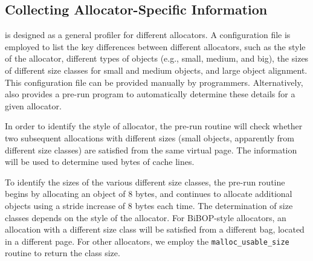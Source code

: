 \subsection{Collecting Allocator-Specific Information}
\label{sec:understandingallocators}

\MP{} is designed as a general profiler for different allocators. A configuration file is employed to list the key differences between different allocators, such as the style of the allocator, different types of objects (e.g., small, medium, and big), the sizes of different size classes for small and medium objects, and large object alignment. This configuration file can be provided manually by programmers. Alternatively, \MP{} also provides a pre-run program to automatically determine these details for a given allocator.

In order to identify the style of allocator, the pre-run routine will check whether two subsequent allocations with different sizes (small objects, apparently from different size classes) are satisfied from the same virtual page. 
The information will be used to determine used bytes of cache lines. 

To identify the sizes of the various different size classes, the pre-run routine begins by allocating an object of 8 bytes, and continues to allocate additional objects using a stride increase of 8 bytes each time. The determination of size classes depends on the style of the allocator. For BiBOP-style allocators, an allocation with a different size class will be satisfied from a different bag, located in a different page. For other allocators, we employ the \texttt{malloc\_usable\_size} routine to return the class size. 

